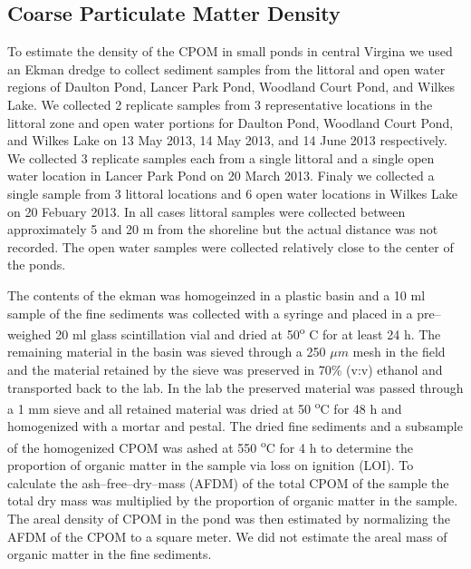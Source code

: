 \subsection{Coarse Particulate Matter Density}

To estimate the density of the CPOM in small ponds in central Virgina we used an Ekman dredge to collect sediment samples from the littoral and open water regions of Daulton Pond, Lancer Park Pond, Woodland Court Pond, and Wilkes Lake. We collected 2 replicate samples from 3 representative locations in the littoral zone and open water portions for Daulton Pond, Woodland Court Pond, and Wilkes Lake on 13 May 2013, 14 May 2013, and 14 June 2013 respectively. We collected 3 replicate samples each from a single littoral and a single open water location in Lancer Park Pond on 20 March 2013.  Finaly we collected a single sample from 3 littoral locations and 6 open water locations in Wilkes Lake on 20 Febuary 2013. In all cases littoral samples were collected between approximately 5 and 20 m from the shoreline but the actual distance was not recorded.  The open water samples were collected relatively close to the center of the ponds.

The contents of the ekman was homogeinzed in a plastic basin and a 10 ml sample of the fine sediments was collected with a syringe and placed in a pre--weighed 20 ml glass scintillation vial and dried at 50\textsuperscript{o} C for at least 24 h. The remaining material in the basin was sieved through a 250 $\mu m$ mesh in the field and the material retained by the sieve was preserved in 70\% (v:v) ethanol and transported back to the lab.  In the lab the preserved material was passed through a 1 mm sieve and all retained material was dried at 50 \textsuperscript{o}C for 48 h and homogenized with a mortar and pestal. The dried fine sediments and a subsample of the homogenized CPOM was ashed at 550 \textsuperscript{o}C for 4 h to determine the proportion of organic matter in the sample via loss on ignition (LOI).  To calculate the ash--free--dry--mass (AFDM) of the total CPOM of the sample the total dry mass was multiplied by the proportion of organic matter in the sample. The areal density of CPOM in the pond was then estimated by normalizing the AFDM of the CPOM to a square meter. We did not estimate the areal mass of organic matter in the fine sediments.
  
  